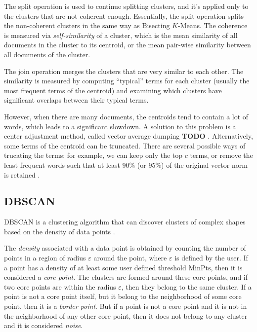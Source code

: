 The split operation is used to continue splitting clusters,
and it's applied only to the clusters that are not coherent
enough. Essentially, the split operation splits the non-coherent
clusters in the same way as Bisecting $K$-Means.
The coherence is measured via \emph{self-similarity} of a cluster,
which is the mean similarity of all documents in the cluster to
its centroid, or the mean pair-wise similarity between all documents
of the cluster.

The join operation merges the clusters that are very similar
to each other. The similarity is measured by computing ``typical''
terms for each cluster (usually the most frequent terms of
the centroid) and examining which clusters have significant
overlaps between their typical terms.


However, when there are many documents, the centroids tend
to contain a lot of words, which leads to a significant slowdown.
A solution to this problem is a center adjustment method, called
vector average dumping \textbf{TODO} \cite{larsen1999fast}.
Alternatively, some terms of the centroid can be
truncated. There are several possible ways of trucating
the terms: for example, we can keep only the top $c$ terms, or
remove the least frequent words such that at least 90\% (or 95\%) of
the original vector norm is retained \cite{schutze1997projections}.



\subsection{DBSCAN} \label{sec:dbscan}


DBSCAN is a clustering algorithm that can discover
clusters of complex shapes based on the density of
data points \cite{ester1996density}.

The \emph{density} associated with a data point is obtained by
counting the number of points in a region of radius $\varepsilon$
around the point, where $\varepsilon$  is defined by the user. 
If a point has a density of at least some user defined
threshold $\text{MinPts}$, then it is considered a \emph{core point}.
The clusters are formed around these core points, and if two core points
are within the radius $\varepsilon$, then they belong to the same cluster.
If a point is not a core point itself, but it belong to the neighborhood of some
core point, then it is a \emph{border point}. But if a point is not a core point
and it is not in the neighborhood of any other core point, then it does not
belong to any cluster and it is considered \emph{noise}.

